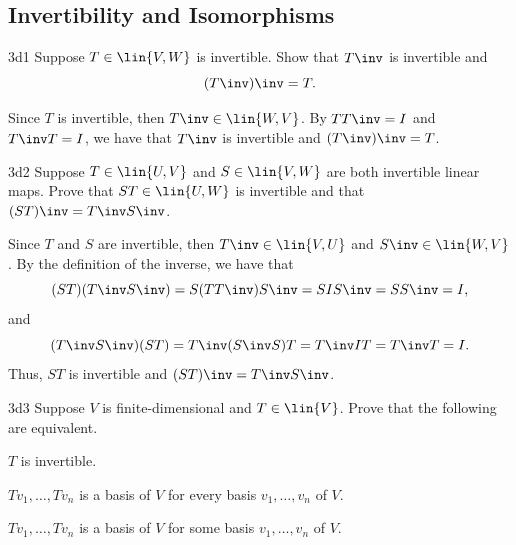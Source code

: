 \subsection{Invertibility and Isomorphisms}

\begin{exercise}{3d1}
    Suppose $T \in \lin{V, W}$ is invertible.
	Show that $T\inv$ is invertible and
    \[
    	(T\inv)\inv = T.
    \]
\end{exercise}

\begin{sol}
    Since $T$ is invertible, then $T\inv \in \lin{W, V}$.
	By $TT\inv = I$ and $T\inv T = I$, we have that $T\inv$ is invertible and $(T\inv)\inv = T$.
\end{sol}

\begin{exercise}{3d2}
    Suppose $T \in \lin{U, V}$ and $S \in \lin{V, W}$ are both invertible linear maps.
	Prove that $ST \in \lin{U, W}$ is invertible and that $(ST)\inv = T\inv S\inv$.
\end{exercise}

\begin{sol}
    Since $T$ and $S$ are invertible, then $T\inv \in \lin{V, U}$ and $S\inv \in \lin{W, V}$.
	By the definition of the inverse, we have that
    \[
    	(ST)(T\inv S\inv) = S(TT\inv)S\inv = SIS\inv = SS\inv = I,
    \]
    and
    \[
    	(T\inv S\inv)(ST) = T\inv(S\inv S)T = T\inv IT = T\inv T = I.
    \]
    Thus, $ST$ is invertible and $(ST)\inv = T\inv S\inv$.
\end{sol}

\begin{exercise}{3d3}
    Suppose $V$ is finite-dimensional and $T \in \lin{V}$.
	Prove that the following are equivalent.
    \begin{subexercises}
        \item $T$ is invertible.
        \item $Tv_1, \ldots, Tv_n$ is a basis of $V$ for every basis $v_1, \ldots, v_n$ of $V$.
        \item $Tv_1, \ldots, Tv_n$ is a basis of $V$ for some basis $v_1, \ldots, v_n$ of $V$.
    \end{subexercises}
\end{exercise}

